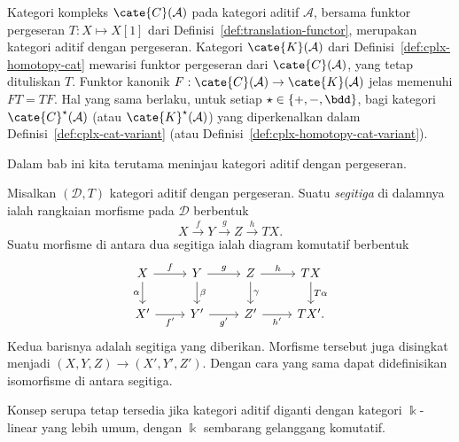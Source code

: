 \begin{contoh}\label{eg:cplx-as-translation-cat}
	Kategori kompleks $\cate{C}(\mathcal{A})$ pada kategori aditif
	$\mathcal{A}$, bersama funktor pergeseran $T:X\mapsto X[1]$ dari
	Definisi~\ref{def:translation-functor}, merupakan kategori aditif dengan
	pergeseran. Kategori $\cate{K}(\mathcal{A})$ dari
	Definisi~\ref{def:cplx-homotopy-cat} mewarisi funktor pergeseran dari
	$\cate{C}(\mathcal{A})$, yang tetap dituliskan $T$. Funktor kanonik
	$F:\cate{C}(\mathcal{A})\to\cate{K}(\mathcal{A})$ jelas memenuhi
	$FT=TF$. Hal yang sama berlaku, untuk setiap
	$\star\in\{+,-,\bdd\}$, bagi kategori $\cate{C}^{\star}(\mathcal{A})$
	(atau $\cate{K}^{\star}(\mathcal{A})$) yang diperkenalkan dalam
	Definisi~\ref{def:cplx-cat-variant} (atau
	Definisi~\ref{def:cplx-homotopy-cat-variant}).
\end{contoh}

Dalam bab ini kita terutama meninjau kategori aditif dengan pergeseran.

\begin{definisi}
	Misalkan $(\mathcal{D},T)$ kategori aditif dengan pergeseran. Suatu
	\emph{segitiga} di dalamnya ialah rangkaian morfisme pada $\mathcal{D}$
	berbentuk
	\[ X\xrightarrow{f}Y\xrightarrow{g}Z\xrightarrow{h}TX. \]
	Suatu morfisme di antara dua segitiga ialah diagram komutatif berbentuk
	\[\begin{tikzcd}
		X \arrow[r,"f"] \arrow[d,"\alpha"'] &
		Y \arrow[r,"g"] \arrow[d,"\beta"] &
		Z \arrow[r,"h"] \arrow[d,"\gamma"] &
		TX \arrow[d,"T\alpha"] \\
		X' \arrow[r,"{f'}"'] & Y' \arrow[r,"{g'}"'] &
		Z' \arrow[r,"{h'}"'] & TX'.
	\end{tikzcd}\]
	Kedua barisnya adalah segitiga yang diberikan. Morfisme tersebut juga
	disingkat menjadi $(X,Y,Z)\to(X',Y',Z')$. Dengan cara yang sama dapat
	didefinisikan isomorfisme di antara segitiga.

	Konsep serupa tetap tersedia jika kategori aditif diganti dengan kategori
	$\Bbbk$-linear yang lebih umum, dengan $\Bbbk$ sembarang gelanggang
	komutatif.
\end{definisi}


